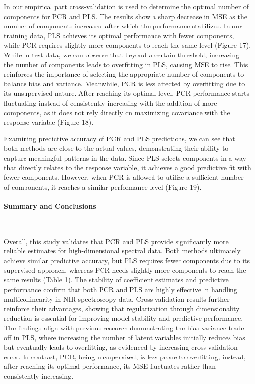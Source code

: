 \documentclass[11pt,twoside,a4paper]{article}
\begin{document}
In our empirical part cross-validation is used to determine the optimal number of components for PCR and PLS. The results show a sharp decrease in MSE as the number of components increases, after which the performance stabilizes. In our training data, PLS achieves its optimal performance with fewer components, while PCR requires slightly more components to reach the same level (Figure 17). While in test data, we can observe that beyond a certain threshold, increasing the number of components leads to overfitting in PLS, causing MSE to rise. This reinforces the importance of selecting the appropriate number of components to balance bias and variance. Meanwhile, PCR is less affected by overfitting due to its unsupervised nature. After reaching its optimal level, PCR performance starts fluctuating instead of consistently increasing with the addition of more components, as it does not rely directly on maximizing covariance with the response variable (Figure 18).

Examining predictive accuracy of PCR and PLS predictions, we can see that both methods are close to the actual values, demonstrating their ability to capture meaningful patterns in the data. Since PLS selects components in a way that directly relates to the response variable, it achieves a good predictive fit with fewer components. However, when PCR is allowed to utilize a sufficient number of components, it reaches a similar performance level (Figure 19).

\paragraph{Summary and Conclusions} \ \

Overall, this study validates that PCR and PLS provide significantly more reliable estimates for high-dimensional spectral data. Both methods ultimately achieve similar predictive accuracy, but PLS requires fewer components due to its supervised approach, whereas PCR needs slightly more components to reach the same results (Table 1). The stability of coefficient estimates and predictive performance confirm that both PCR and PLS are highly effective in handling multicollinearity in NIR spectroscopy data. Cross-validation results further reinforce their advantages, showing that regularization through dimensionality reduction is essential for improving model stability and predictive performance. The findings align with previous research demonstrating the bias-variance trade-off in PLS, where increasing the number of latent variables initially reduces bias but eventually leads to overfitting, as evidenced by increasing cross-validation error. In contrast, PCR, being unsupervised, is less prone to overfitting; instead, after reaching its optimal performance, its MSE fluctuates rather than consistently increasing.
\end{document}

